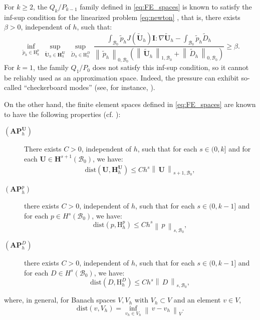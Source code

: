 \documentclass{sfuthesis}
\numberwithin{equation}{section}
\numberwithin{figure}{chapter}
\numberwithin{table}{chapter}
\theoremstyle{definition}
\def\*#1{{\mathbf{#1}}} %
\newcommand{\B}{\mathcal{B}}
\newcommand{\Hhu}{\mathbf{H}_h^{\*U}}
\newcommand{\Hhp}{\mathrm{H}_h^{p}}
\newcommand{\HhD}{\mathrm{H}_h^{D}}
\newcommand{\norm}[1]{{\left\| \, #1 \, \right\|}}
\begin{document}
For $k \geq 2$, the $Q_k/P_{k-1}$ family defined in \eqref{eq:FE_spaces} is known to satisfy the inf-sup condition for the linearized problem \eqref{eq:newton} \cite{BrinkStein1996}, that is, there exists $\beta > 0$, independent of $h$, such that:
\begin{equation}
    \inf_{\widetilde{p}_h \in \Hhp} \ \sup_{\widetilde{\*U}_h \in \Hhu} \ \sup_{\widetilde{D}_h \in \HhD} \ \dfrac{\displaystyle \int_{\B_0} \widetilde{p}_h J(\widetilde{\*U}_h) \*I : \nabla \widetilde{\*U}_h - \int_{\B_0} \widetilde{p}_h \widetilde{D}_h}{\norm{\widetilde{p}_h}_{0,\B_0} \left( \norm{\widetilde{\*U}_h}_{1,\B_0} + \norm{\widetilde{D}_h}_{0,\B_0} \right)} \geq \beta.
\end{equation}
For $k=1$, the family $Q_1/P_0$ does not satisfy this inf-sup condition, so it cannot be reliably used as an approximation space. Indeed, the pressure can exhibit so-called ``checkerboard modes'' (see, for instance, \cite{Kadapa2024}).

On the other hand, the finite element spaces defined in \eqref{eq:FE_spaces} are known to have the following properties (cf. \cite{BoffiBrezziFortin2013,Gatica2014}):

\begin{description}
    \item[$(\mathbf{AP}_h^\*U)$] There exists $C>0$, independent of $h$, such that for each $s \in (0,k]$ and for each $\*U \in \*H^{s+1}(\B_0)$, we have:
    \begin{eqnarray}
        \mathrm{dist}(\*U,\Hhu) \leq C h^s \norm{\*U}_{s+1,\B_0},
    \end{eqnarray}
    \item[$(\mathbf{AP}_h^p)$] there exists $C>0$, independent of $h$, such that for each $s \in (0,k-1]$ and for each $p \in H^{s}(\B_0)$, we have:
    \begin{equation}
        \mathrm{dist}(p,\Hhp) \leq C h^s \norm{p}_{s,\B_0},
    \end{equation}
    \item[$(\mathbf{AP}_h^D)$] there exists $C>0$, independent of $h$, such that for each $s \in (0,k-1]$ and for each $D \in H^{s}(\B_0)$, we have:
    \begin{equation}
        \mathrm{dist}(D,\HhD) \leq C h^s \norm{D}_{s,\B_0},
    \end{equation}
\end{description}
where, in general, for Banach spaces $V,V_h$ with $V_h \subset V$ and an element $v \in V$, 
\[
    \mathrm{dist}(v, V_h) = \inf_{v_h \in V_h} \norm{v-v_h}_V.
\]
\end{document}
